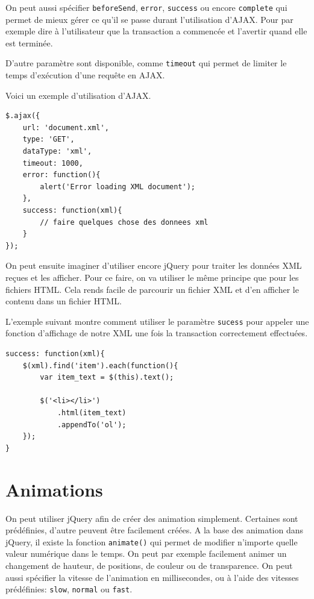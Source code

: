 \documentclass[10pt,a4paper,titlepage]{article}
\begin{document}
On peut aussi spécifier \texttt{beforeSend}, \texttt{error}, \texttt{success} ou encore \texttt{complete} qui permet de mieux gérer ce qu'il se passe durant l'utilisation d'AJAX. Pour par exemple dire à l'utilisateur que la transaction a commencée et l'avertir quand elle est terminée.

D'autre paramètre sont disponible, comme \texttt{timeout} qui permet de limiter le temps d'exécution d'une requête en AJAX.

Voici un exemple d'utilisation d'AJAX. 

\begin{lstlisting}
$.ajax({
    url: 'document.xml',
    type: 'GET',
    dataType: 'xml',
    timeout: 1000,
    error: function(){
        alert('Error loading XML document');
    },
    success: function(xml){
        // faire quelques chose des donnees xml
    }
});
\end{lstlisting}

On peut ensuite imaginer d'utiliser encore jQuery pour traiter les données XML reçues et les afficher. Pour ce faire, on va utiliser le même principe que pour les fichiers HTML. Cela rends facile de parcourir un fichier XML et d'en afficher le contenu dans un fichier HTML.

L'exemple suivant montre comment utiliser le paramètre \texttt{sucess} pour appeler une fonction d'affichage de notre XML une fois la transaction correctement effectuées.

\begin{lstlisting}
success: function(xml){
    $(xml).find('item').each(function(){
        var item_text = $(this).text();

        $('<li></li>')
            .html(item_text)
            .appendTo('ol');
    });
}
\end{lstlisting}

\newpage
\section{Animations}

On peut utiliser jQuery afin de créer des animation simplement. Certaines sont prédéfinies, d'autre peuvent être facilement créées. A la base des animation dans jQuery, il existe la fonction \texttt{animate()} qui permet de modifier n'importe quelle valeur numérique dans le temps. On peut par exemple facilement animer un changement de hauteur, de positions, de couleur ou de transparence. On peut aussi spécifier la vitesse de l'animation en millisecondes, ou à l'aide des vitesses prédéfinies: \texttt{slow}, \texttt{normal} ou \texttt{fast}.
\end{document}
